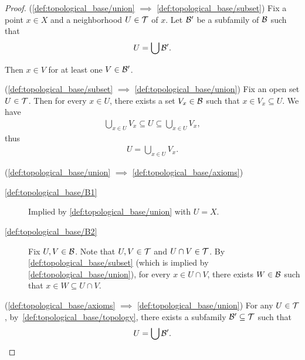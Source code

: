 \begin{proof}
  (\ref{def:topological_base/union} $\implies$ \ref{def:topological_base/subset}) Fix a point $x \in X$ and a neighborhood $U \in \mathcal T$ of $x$. Let $\mathcal B'$ be a subfamily of $\mathcal B$ such that
  \begin{align*}
    U = \bigcup \mathcal B'.
  \end{align*}

  Then $x \in V$ for at least one $V \in \mathcal B'$.

  (\ref{def:topological_base/subset} $\implies$ \ref{def:topological_base/union}) Fix an open set $U \in \mathcal T$. Then for every $x \in U$, there exists a set $V_x \in \mathcal B$ such that $x \in V_x \subseteq U$. We have
  \begin{align*}
    \bigcup_{x \in U} V_x \subseteq U \subseteq \bigcup_{x \in U} V_x,
  \end{align*}
  thus
  \begin{align*}
    U = \bigcup_{x \in U} V_x.
  \end{align*}

  (\ref{def:topological_base/union} $\implies$ \ref{def:topological_base/axioms})
  \begin{description}
    \item[\ref{def:topological_base/B1}] Implied by \cref{def:topological_base/union} with $U = X$.
    \item[\ref{def:topological_base/B2}] Fix $U, V \in \mathcal B$. Note that $U, V \in \mathcal T$ and $U \cap V \in \mathcal T$. By \cref{def:topological_base/subset} (which is implied by \cref{def:topological_base/union}), for every $x \in U \cap V$, there exists $W \in \mathcal B$ such that $x \in W \subseteq U \cap V$.
  \end{description}

  (\ref{def:topological_base/axioms} $\implies$ \ref{def:topological_base/union}) For any $U \in \mathcal T$, by~\cref{def:topological_base/topology}, there exists a subfamily $\mathcal B' \subseteq \mathcal T$ such that
  \begin{align*}
    U = \bigcup \mathcal B'.
  \end{align*}
\end{proof}

